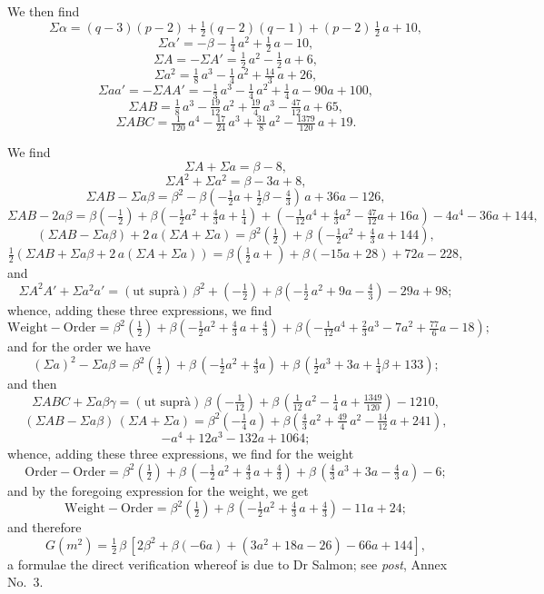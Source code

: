 \documentclass[11pt,a4paper]{article}
\begin{document}
\medskip

\noindent We then find
\[
\Sigma\alpha = (q-3)(p-2) + \tfrac{1}{2}(q-2)(q-1) + (p-2)\,\tfrac{1}{2}\,a + 10,
\]
\[
\Sigma\alpha' = -\beta - \tfrac{1}{4}\,a^2 + \tfrac{1}{2}\,a - 10,
\]
\[
\Sigma A = -\Sigma A' = \tfrac{1}{2}\,a^2 - \tfrac{1}{2}\,a + 6,
\]
\[
\Sigma a^2 = \tfrac{1}{8}\,a^3 - \tfrac{1}{4}\,a^2 + \tfrac{14}{3}\,a + 26,
\]
\[
\Sigma a a' = -\Sigma A A' = -\tfrac{1}{3}\,a^3 - \tfrac{1}{4}\,a^2 + \tfrac{1}{4}\,a - 90a + 100,
\]
\[
\Sigma A B = \tfrac{1}{8}\,a^3 - \tfrac{19}{12}\,a^2 + \tfrac{19}{4}\,a^3 - \tfrac{47}{12}\,a + 65,
\]
\[
\Sigma A B C = \tfrac{1}{120}\,a^4 - \tfrac{17}{24}\,a^3 + \tfrac{31}{8}\,a^2 - \tfrac{1379}{120}\,a + 19.
\]

\medskip

\noindent We find
\[
\Sigma A + \Sigma a = \beta - 8,
\]
\[
\Sigma A^2 + \Sigma a^2 = \beta - 3a + 8,
\]
\[
\Sigma AB - \Sigma a\beta = \beta^2 - \beta(-\tfrac{1}{2}a + \tfrac{1}{2}\beta - \tfrac{4}{3})\,a + 36a - 126,
\]
\[
\Sigma AB - 2a\beta = \beta(-\tfrac{1}{2}) + \beta(-\tfrac{1}{2}a^2 + \tfrac{4}{3}a + \tfrac{1}{4}) + (-\tfrac{1}{12}a^4 + \tfrac{4}{3}a^2 - \tfrac{47}{12}a + 16a) - 4a^4 - 36a + 144,
\]
\[
(\Sigma A B - \Sigma a \beta) + 2\,a(\Sigma A + \Sigma a) = \beta^2(\tfrac{1}{2}) + \beta\,(-\tfrac{1}{2}a^2 + \tfrac{4}{3}\,a + 144),
\]
\[
\tfrac{1}{2}(\Sigma A B + \Sigma a \beta + 2\,a(\Sigma A + \Sigma a)) = \beta(\tfrac{1}{2}\,a + ) + \beta(-15a + 28) + 72a - 228,
\]
and
\[
\Sigma A^2 A' + \Sigma a^2 a' = (\text{ut supr\`{a}})\,\beta^2 + (-\tfrac{1}{2}) + \beta(-\tfrac{1}{2}\,a^2 + 9a - \tfrac{4}{3}) - 29a + 98;
\]
whence, adding these three expressions, we find
\[
\text{Weight}-\text{Order} = \beta^2(\tfrac{1}{2}) + \beta(-\tfrac{1}{2}a^2 + \tfrac{4}{3}\,a + \tfrac{4}{3}) + \beta(-\tfrac{1}{12}a^4 + \tfrac{2}{3}a^3 - 7a^2 + \tfrac{77}{6}a - 18);
\]
and for the order we have
\[
(\Sigma a)^2 - \Sigma a\beta = \beta^2(\tfrac{1}{2}) + \beta\,(-\tfrac{1}{2}a^2 + \tfrac{4}{3}a) + \beta\,(\tfrac{1}{2}a^3 + 3a + \tfrac{1}{4}\beta + 133);
\]
and then
\[
\Sigma A B C + \Sigma a \beta \gamma = (\text{ut supr\`{a}})\,\beta\,(-\tfrac{1}{12}) + \beta\,(\tfrac{1}{12}\,a^2 - \tfrac{1}{4}\,a + \tfrac{1349}{120}) - 1210,
\]
\[
(\Sigma A B - \Sigma a \beta)\,(\Sigma A + \Sigma a) = \beta^2(-\tfrac{1}{4}\,a) + \beta(\tfrac{4}{3}\,a^2 + \tfrac{49}{4}\,a^2 - \tfrac{14}{12}\,a + 241),
\]
\[
- a^4 + 12a^3 - 132a + 1064;
\]
whence, adding these three expressions, we find for the weight
\[
\text{Order} - \text{Order} = \beta^2(\tfrac{1}{2}) + \beta\,(-\tfrac{1}{2}\,a^2 + \tfrac{4}{3}\,a + \tfrac{4}{3}) + \beta\,(\tfrac{4}{3}\,a^3 + 3a - \tfrac{4}{3}\,a) - 6;
\]
and by the foregoing expression for the weight, we get
\[
\text{Weight} - \text{Order} = \beta^2(\tfrac{1}{2}) + \beta\,(-\tfrac{1}{2}a^2 + \tfrac{4}{3}\,a + \tfrac{4}{3}) - 11a + 24;
\]
and therefore
\[
G(m^2) = \tfrac{1}{2}\,\beta\,[2\beta^2 + \beta(-6a) + (3a^2 + 18a - 26) - 66a + 144],
\]
a formulae the direct verification whereof is due to Dr Salmon; see \textit{post}, Annex No.\ 3.
\end{document}
